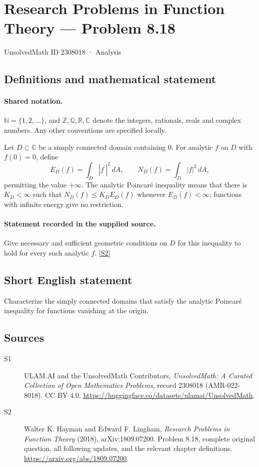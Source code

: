 \documentclass[11pt]{book}
\newcommand{\sref}[2]{\hyperlink{source:#1:#2}{[S#2]}}
\begin{document}
\setcounter{section}{2308017}
\section{Research Problems in Function Theory — Problem 8.18}\label{2308018}
{\small\sffamily UnsolvedMath ID 2308018 · Analysis}
\subsection{Definitions and mathematical statement}

\paragraph{Shared notation.}$\mathbb N=\{1,2,\ldots\}$, and $\mathbb Z,\mathbb Q,\mathbb R,\mathbb C$ denote the integers, rationals, reals and complex numbers. Any other conventions are specified locally.


Let $D\subset\mathbb C$ be a simply connected domain containing $0$. For analytic $f$ on $D$ with $f(0)=0$, define \[E_D(f)=\int_D|f^{\prime}|^2\,dA,\qquad N_D(f)=\int_D|f|^2\,dA,\] permitting the value $+\infty$. The analytic Poincar\'e inequality means that there is $K_D<\infty$ such that $N_D(f)\le K_DE_D(f)$ whenever $E_D(f)<\infty$; functions with infinite energy give no restriction.
\paragraph{Statement recorded in the supplied source.}
Give necessary and sufficient geometric conditions on $D$ for this inequality to hold for every such analytic $f$. \sref{2308018}{2}
\subsection{Short English statement}
Characterize the simply connected domains that satisfy the analytic Poincaré inequality for functions vanishing at the origin.
\subsection{Sources}
\begin{description}
\item[\hypertarget{source:2308018:1}{S1}] ULAM.AI and the UnsolvedMath Contributors, \emph{UnsolvedMath: A Curated Collection of Open Mathematics Problems}, record 2308018 (AMR-022-8018). CC BY 4.0. \url{https://huggingface.co/datasets/ulamai/UnsolvedMath}.
\item[\hypertarget{source:2308018:2}{S2}] Walter K. Hayman and Edward F. Lingham, \emph{Research Problems in Function Theory} (2018), arXiv:1809.07200. Problem 8.18, complete original question, all following updates, and the relevant chapter definitions. \url{https://arxiv.org/abs/1809.07200}.
\end{description}
\label{end:2308018}
\end{document}

